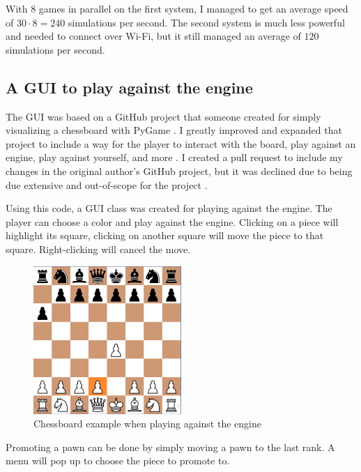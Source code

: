 \documentclass{article}
\begin{document}
With 8 games in parallel on the first system, I managed to get an average speed of $30 \cdot 8 = 240$ simulations per second.
The second system is much less powerful and needed to connect over Wi-Fi, but it still managed an average of $120$ simulations per second. 

\subsection{A GUI to play against the engine}

The GUI was based on a GitHub project that someone created for simply visualizing a chessboard with PyGame \cite{adefokunChessboardAhirajustice2022, pygame}.
I greatly improved and expanded that project to include a way for the player to interact with the board, play against an engine,
play against yourself, and more \cite{zjefferChessboardZjeffer2022}. I created a pull request to include my changes in the original author's GitHub project,
but it was declined due to being due extensive and out-of-scope for the project \cite{adefokunChessboard2022pull}.

Using this code, a GUI class was created for playing against the engine. The player can choose a color and play against
the engine. Clicking on a piece will highlight its square, clicking on another square will move the piece to that square.
Right-clicking will cancel the move.

\begin{figure}[H]
    \centering
    \includegraphics[width=0.5\textwidth]{img/chessboard-gui.png}
    \caption{Chessboard example when playing against the engine}
\end{figure}

Promoting a pawn can be done by simply moving a pawn to the last rank. A menu will pop up 
to choose the piece to promote to.
\end{document}
